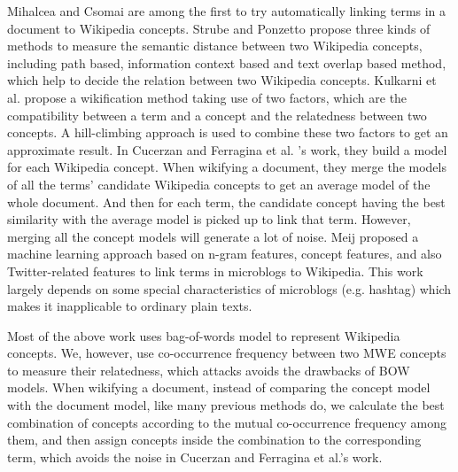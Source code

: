 Mihalcea and Csomai \cite{MihalceaC07} are among the first to try
automatically linking terms in a document to Wikipedia concepts. Strube and
Ponzetto\cite{StrubeP06} propose three kinds of methods to measure the semantic
distance between two Wikipedia concepts, including path based, information
context based and text overlap based method, which help to decide the relation
between two Wikipedia concepts.
Kulkarni et al. \cite{kulkarni2009collective} propose a wikification method
taking use of two factors, which are the compatibility between a term and a
concept and the relatedness between two concepts. A hill-climbing approach
is used to combine these two factors to get an approximate result.
In Cucerzan \cite{cucerzan2007large} and Ferragina et al. \cite{ferragina2010tagme}'s
work, they build a model for each Wikipedia concept. When wikifying a document,
they merge the models of all the terms' candidate Wikipedia concepts to get
an average model of the whole document. And then for each term, the candidate concept
having the best similarity with the average model is picked up to link that term.
However, merging all the concept models will generate a lot of noise.
Meij\cite{Meij12} proposed a machine learning approach based on 
n-gram features, concept features, and also Twitter-related features to 
link terms in microblogs to Wikipedia. This work largely depends on 
some special characteristics of microblogs (e.g. hashtag) which makes
it inapplicable to ordinary plain texts.

Most of the above work uses bag-of-words model to represent Wikipedia concepts.
We, however, use co-occurrence
frequency between two MWE concepts to measure their relatedness, which
attacks avoids the drawbacks of BOW models.
When wikifying a document, instead of comparing the concept model with
the document model, like many previous methods do,
we calculate the best combination of concepts according to
the mutual co-occurrence frequency among them, and then assign concepts inside
the combination to the corresponding term, which avoids the noise in
Cucerzan and Ferragina et al.'s work.


